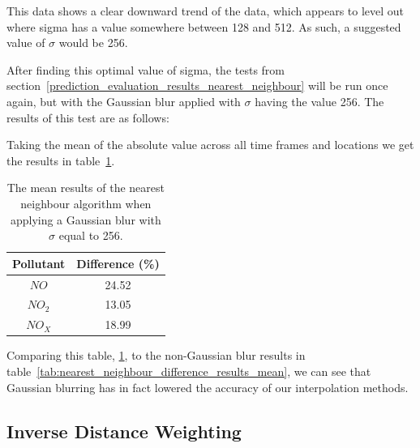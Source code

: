 
			This data shows a clear downward trend of the data, which appears to level out where sigma has a value somewhere between 128 and 512. As such, a suggested value of $\sigma$ would be 256. 

			After finding this optimal value of sigma, the tests from section~\ref{prediction_evaluation_results_nearest_neighbour} will be run once again, but with the Gaussian blur applied with $\sigma$ having the value 256. The results of this test are as follows:


			Taking the mean of the absolute value across all time frames and locations we get the results in table~\ref{tab:nearest_neighbour_convolution_results}.

			\begin{table}
				\centering
	    		\begin{tabular}{|c|c|}
	    			\hline
					Pollutant & Difference (\%) \\ \hline
					$NO$ & 24.52 \\
					$NO_{2}$ & 13.05 \\
					$NO_{X}$ & 18.99 \\
					\hline 
				\end{tabular}
				\caption{The mean results of the nearest neighbour algorithm when applying a Gaussian blur with $\sigma$ equal to 256.}
				\label{tab:nearest_neighbour_convolution_results}
			\end{table}

			Comparing this table, \ref{tab:nearest_neighbour_convolution_results}, to the non-Gaussian blur results in table~\ref{tab:nearest_neighbour_difference_results_mean}, we can see that Gaussian blurring has in fact lowered the accuracy of our interpolation methods. 

        \subsection{Inverse Distance Weighting}\label{prediction_evaluation_results_inverse_distance_weighting}

